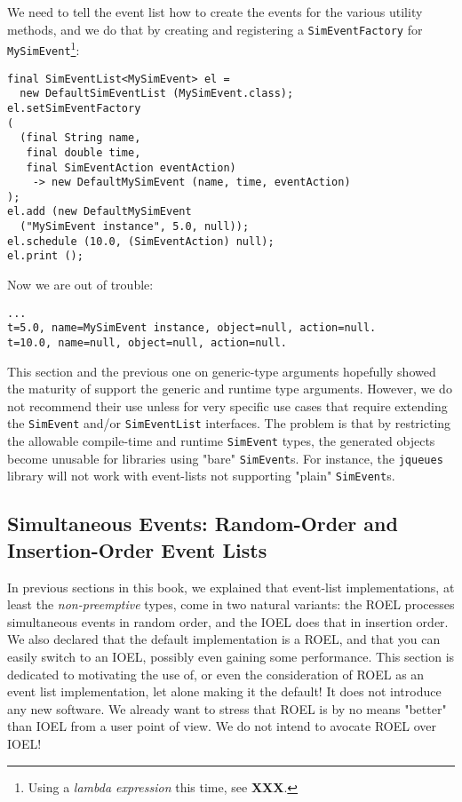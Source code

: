 \documentclass[12pt]{book}
\begin{document}
We need to tell the event list how to create the events
  for the various utility methods,
  and we do that by creating and registering a
  \lstinline|SimEventFactory| for \lstinline|MySimEvent|\footnote{
Using a {\em lambda expression\/} this time, see {\bf XXX}.}:
\begin{lstlisting}[basicstyle=\footnotesize]
final SimEventList<MySimEvent> el =
  new DefaultSimEventList (MySimEvent.class);
el.setSimEventFactory
(
  (final String name,
   final double time,
   final SimEventAction eventAction)
    -> new DefaultMySimEvent (name, time, eventAction)
);
el.add (new DefaultMySimEvent
  ("MySimEvent instance", 5.0, null));
el.schedule (10.0, (SimEventAction) null);
el.print ();
\end{lstlisting}
Now we are out of trouble:
\begin{lstlisting}[basicstyle=\footnotesize]
...
t=5.0, name=MySimEvent instance, object=null, action=null.
t=10.0, name=null, object=null, action=null.
\end{lstlisting}
  
This section and the previous one on generic-type
  arguments hopefully showed the maturity of
  support the generic and runtime type arguments.
However,
  we do not recommend their use unless
  for very specific use cases
  that require extending the
  \lstinline|SimEvent| and/or \lstinline|SimEventList|
  interfaces.
The problem is that by restricting the
  allowable compile-time and runtime \lstinline|SimEvent|
  types, the generated objects
  become unusable for libraries
  using "bare" \lstinline|SimEvent|s.
For instance,
  the \lstinline|jqueues| library
  will not work with event-lists
  not supporting "plain" \lstinline|SimEvent|s.

\subsection{Simultaneous Events: Random-Order and Insertion-Order Event Lists}

In previous sections in this book,
  we explained that event-list implementations,
  at least the {\em non-preemptive\/} types,
  come in two natural variants:
  the ROEL processes simultaneous events in random order,
  and the IOEL does that in insertion order.
We also declared that the default implementation is a
  ROEL, and that you can easily switch to an IOEL,
  possibly even gaining some performance.
This section is dedicated to motivating the use of,
  or even the consideration of ROEL as an event list implementation,
  let alone making it the default!
It does not introduce any new software.
We already want to stress that ROEL is by no means
  "better" than IOEL from a user point of view.
We do not intend to avocate ROEL over IOEL!
\end{document}
